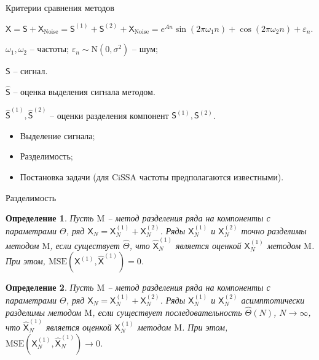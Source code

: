 \documentclass[notheorems, handout]{beamer}
\newtheorem{definition}{Определение}
\newcommand{\TS}{\mathsf{X}}
\begin{document}
	\begin{frame}{Критерии сравнения методов}

		\textbf{} 

		$\TS = \mathsf{S} + \TS_{\mathrm{Noise}}=
		\mathsf{S}^{(1)} + \mathsf{S}^{(2)} + \TS_{\mathrm{Noise}}= 
		e^{A{n}}
		\sin\left({2\pi\omega_1 n}\right) + 
		\cos\left({2\pi\omega_2 n}\right) + \varepsilon_n$.

		$\omega_1, \omega_2$ -- частоты;
		$\varepsilon_n \sim \mathrm N(0, \sigma^2)$ -- шум; 

		$\mathsf{S}$ -- сигнал.

		$\hat{\mathsf{S}}$ -- оценка выделения сигнала методом.

		$\hat{\mathsf{S}}^{(1)}, 
		\hat{\mathsf{S}}^{(2)}$ -- оценки разделения компонент $\mathsf{S}^{(1)}, \mathsf{S}^{(2)}$.

		\bigskip

		\textbf{}
		\begin{itemize}
			\item Выделение сигнала;
			\item Разделимость;
			\item Постановка задачи (для CiSSA частоты предполагаются известными).
		\end{itemize}
		
	\end{frame}


	\begin{frame}{Разделимость}
		\begin{definition}
			\label{def:exact}
			Пусть $\mathrm M$ --  метод разделения ряда на компоненты с параметрами \( \Theta \), ряд \( \TS_N = \TS^{(1)}_N + \TS^{(2)}_N \). 
			Ряды \( \TS^{(1)}_N \) и \( \TS^{(2)}_N \) точно разделимы методом $\mathrm M$, если существует \( \hat{\Theta} \), что \( \hat{\TS}^{(1)}_N \) является оценкой \( \TS^{(1)}_N \) методом $\mathrm M$. 
			При этом, \( \mathrm{MSE}\left(\TS^{(1)}, \hat{\TS}^{(1)}\right) = 0 \).
		\end{definition}
		\begin{definition}
			\label{def:asymp}
			Пусть $\mathrm M$ --  метод разделения ряда на компоненты с параметрами \( \Theta \), ряд \( \TS_N = \TS^{(1)}_N + \TS^{(2)}_N \). 
			Ряды \( \TS^{(1)}_N \) и \( \TS^{(2)}_N \) асимптотически разделимы методом $\mathrm M$, если существует последовательность \( \hat{\Theta}(N)\), \( N \rightarrow \infty \), что \( \hat{\TS}^{(1)}_N \) является оценкой \( \TS^{(1)}_N \) методом $\mathrm M$. 
			При этом, \( \mathrm{MSE}\left(\TS^{(1)}_N, \hat{\TS}^{(1)}_N\right) \rightarrow 0 \).
		\end{definition}

	\end{frame}
	
\end{document}
